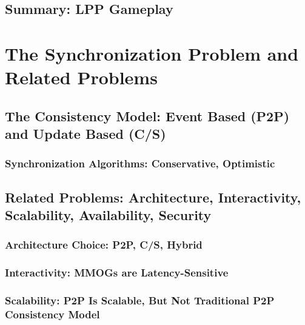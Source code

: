 \documentclass{article}
\begin{document}
\subsection{Summary: LPP Gameplay}

\section{The Synchronization Problem and Related Problems}
\label{dfsync}

\subsection{The Consistency Model: Event Based (P2P) and Update Based (C/S)}

\subsubsection{Synchronization Algorithms: Conservative, Optimistic}

\subsection{Related Problems: Architecture, Interactivity, Scalability, Availability, Security}

\subsubsection{Architecture Choice: P2P, C/S, Hybrid}

\subsubsection{Interactivity: MMOGs are Latency-Sensitive}

\subsubsection{Scalability: P2P Is Scalable, But Not Traditional P2P Consistency Model}
\end{document}
